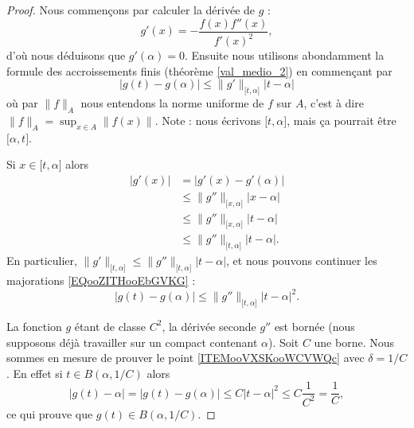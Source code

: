 \begin{proof}
    Nous commençons par calculer la dérivée de \( g\) :
    \begin{equation}
        g'(x)=-\frac{ f(x)f''(x) }{ f'(x)^2 },
    \end{equation}
    d'où nous déduisons que \( g'(\alpha)=0\). Ensuite nous utilisons abondamment la formule des accroissements finis (théorème \ref{val_medio_2}) en commençant par
    \begin{equation}        \label{EQooZITHooEbGVKG}
        | g(t)-g(\alpha) |\leq \| g' \|_{\mathopen[ t , \alpha \mathclose]}| t-\alpha |
    \end{equation}
    où par \( \| f \|_A\) nous entendons la norme uniforme de \( f\) sur \( A\), c'est à dire \( \| f \|_A=\sup_{x\in A}\| f(x) \|\). Note : nous écrivons \( \mathopen[ t , \alpha \mathclose]\), mais ça pourrait être \( \mathopen[ \alpha , t \mathclose]\). 

    Si \( x\in\mathopen[ t , \alpha \mathclose]\) alors
    \begin{subequations}
        \begin{align}
            | g'(x) |&=| g'(x)-g'(\alpha) |\\
            &\leq \| g'' \|_{\mathopen[ x , \alpha \mathclose]}| x-\alpha |\\
            &\leq \| g'' \|_{\mathopen[ x , \alpha \mathclose]}| t-\alpha |\\
            &\leq \| g'' \|_{\mathopen[ t , \alpha \mathclose]}| t-\alpha |.
        \end{align}
    \end{subequations}
    En particulier, \( \| g' \|_{\mathopen[ t , \alpha \mathclose]}\leq \| g'' \|_{\mathopen[ t , \alpha \mathclose]}| t-\alpha |\), et nous pouvons continuer les majorations \eqref{EQooZITHooEbGVKG} :
    \begin{equation}
        | g(t)-g(\alpha) |\leq \| g'' \|_{\mathopen[ t , \alpha \mathclose]}| t-\alpha |^2.
    \end{equation}
    
    La fonction \( g\) étant de classe \( C^2\), la dérivée seconde \( g''\) est bornée (nous supposons déjà travailler sur un compact contenant \( \alpha\)). Soit \( C\) une borne. Nous sommes en mesure de prouver le point \ref{ITEMooVXSKooWCVWQc} avec \( \delta=1/C\). En effet si \( t\in B(\alpha,1/C)\) alors
    \begin{equation}
        | g(t)-\alpha |=| g(t)-g(\alpha) |\leq C| t-\alpha |^2\leq C\frac{1}{ C^2 }=\frac{1}{ C },
    \end{equation}
    ce qui prouve que \( g(t)\in B(\alpha,1/C)\).


\end{proof}
